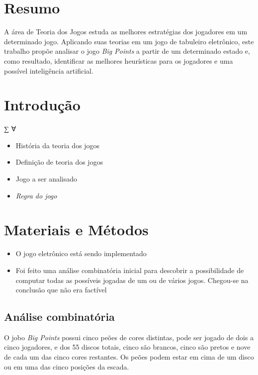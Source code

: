 \section{Resumo}\label{resumo}

A área de Teoria dos Jogos estuda as melhores estratégias dos jogadores
em um determinado jogo. Aplicando suas teorias em um jogo de tabuleiro
eletrônico, este trabalho propõe analisar o jogo \emph{Big Points} a
partir de um determinado estado e, como resultado, identificar as
melhores heurísticas para os jogadores e uma possível inteligência
artificial.

\section{Introdução}\label{introduuxe7uxe3o}

∑ ∀

\begin{itemize}
\itemsep1pt\parskip0pt
\item
  História da teoria dos jogos
\item
  Definição de teoria dos jogos
\item
  Jogo a ser analisado
\item
  \emph{Regra do jogo}
\end{itemize}

\section{Materiais e Métodos}\label{materiais-e-muxe9todos}

\begin{itemize}
\itemsep1pt\parskip0pt
\item
  O jogo eletrônico está sendo implementado
\item
  Foi feito uma análise combinatória inicial para descobrir a
  possibilidade de computar todas as possíveis jogadas de um ou de
  vários jogos. Chegou-se na conclusão que não era factível
\end{itemize}

\subsection{Análise combinatória}\label{anuxe1lise-combinatuxf3ria}

O jobo \emph{Big Points} possui cinco peões de cores distintas, pode ser
jogado de dois a cinco jogadores, e dos 55 discos totais, cinco são
brancos, cinco são pretos e nove de cada um das cinco cores restantes.
Os peões podem estar em cima de um disco ou em uma das cinco posições da
escada.

